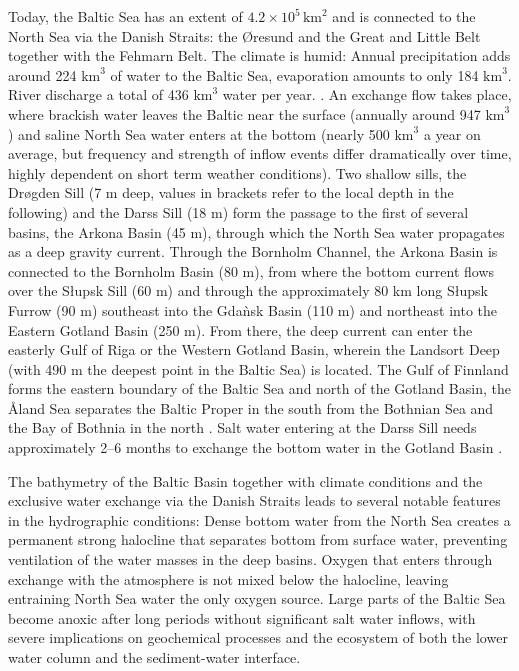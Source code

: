 Today, the Baltic Sea has an extent of $4.2 \times 10^{5} \, \text{km}^2$ \citep[][]{balticsea} and is connected to the North Sea via the Danish Straits: the \O resund and the Great and Little Belt together with the Fehmarn Belt. The climate is humid: Annual precipitation adds around 224 $\text{km}^3$ of water to the Baltic Sea, evaporation amounts to only 184 $\text{km}^3$. River discharge a total of 436 $\text{km}^3$ water per year. \citep[][]{reissmann2009}. An exchange flow takes place, where brackish water leaves the Baltic near the surface (annually around 947 $\text{km}^3$) and saline North Sea water enters at the bottom (nearly 500 $\text{km}^3$ a year on average, but frequency and strength of inflow events differ dramatically over time, highly dependent on short term weather conditions). Two shallow sills, the Dr\o gden Sill (7 m deep, values in brackets refer to the local depth in the following) and the Darss Sill (18 m) form the passage to the first of several basins, the Arkona Basin (45 m), through which the North Sea water propagates as a deep gravity current. Through the Bornholm Channel, the Arkona Basin is connected to the Bornholm Basin (80 m), from where the bottom current flows over the S\l upsk Sill (60 m) and through the approximately 80 km long S\l upsk Furrow (90 m) southeast into the Gda\`{n}sk Basin (110 m) and northeast into the Eastern Gotland Basin (250 m). From there, the deep current can enter the easterly Gulf of Riga or the Western Gotland Basin, wherein the Landsort Deep (with 490 m the deepest point in the Baltic Sea) is located. The Gulf of Finnland forms the eastern boundary of the Baltic Sea and north of the Gotland Basin, the \r{A}land Sea separates the Baltic Proper in the south from the Bothnian Sea and the Bay of Bothnia in the north \citep[][]{reissmann2009}. Salt water entering at the Darss Sill needs approximately 2--6 months to exchange the bottom water in the Gotland Basin \citep[][]{balticsea}. 

The bathymetry of the Baltic Basin together with climate conditions and the exclusive water exchange via the Danish Straits leads to several notable features in the hydrographic conditions: Dense bottom water from the North Sea creates a permanent strong halocline that separates bottom from surface water, preventing ventilation of the water masses in the deep basins. Oxygen that enters through exchange with the atmosphere is not mixed below the halocline, leaving entraining North Sea water the only oxygen source. Large parts of the Baltic Sea become anoxic after long periods without significant salt water inflows, with severe implications on geochemical processes and the ecosystem of both the lower water column and the sediment-water interface. 


